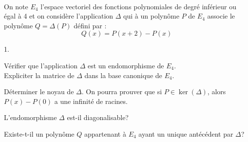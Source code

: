 \documentclass[11pt]{article}%
\begin{document}

\begin{exerciceSP}~\\
  On note $E_4$ l'espace vectoriel des fonctions polynomiales de degré
  inférieur ou égal à 4 et on considère l'application $\Delta$ qui à
  un polynôme $P$ de $E_4$ associe le polynôme $Q = \Delta (P)$ défini
  par :
  \[
  Q(x) = P(x+2) - P(x)
  \]
  \begin{noliste}{1.}
    \setlength{\itemsep}{2mm}
  \item Vérifier que l'application $\Delta$ est un endomorphisme de $E_4$. \\
    Expliciter la matrice de $\Delta$ dans la base canonique de $E_4$.
  \item Déterminer le noyau de $\Delta$. On pourra prouver que si $P
    \in \ker(\Delta)$, alors $P(x) - P(0)$ a une infinité de racines.
  \item L'endomorphisme $\Delta$ est-il diagonalisable?
  \item Existe-t-il un polynôme $Q$ appartenant à $E_4$ ayant un
    unique antécédent par $\Delta$?
  \end{noliste}
\end{exerciceSP}




\end{document}
